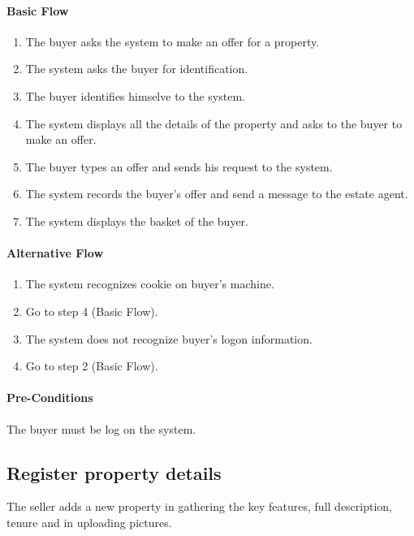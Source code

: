 \documentclass[a4paper,12pt]{article}
\begin{document}
\paragraph{Basic Flow}
\begin{enumerate}
\item The buyer asks the system to make an offer for a property.
\item The system asks the buyer for identification.
\item The buyer identifies himselve to the system.
\item The system displays all the details of the property and asks to the buyer to make an offer.
\item The buyer types an offer and sends his request to the system.
\item The system records the buyer's offer and send a message to the estate agent.
\item The system displays the basket of the buyer.
\end{enumerate}
\paragraph{Alternative Flow}
\begin{enumerate}
\item The system recognizes cookie on buyer's machine. 
\item Go to step 4 (Basic Flow).
\item The system does not recognize buyer's logon information.
\item Go to step 2 (Basic Flow).
\end{enumerate}
\paragraph{Pre-Conditions}
The buyer must be log on the system.

\subsection{Register property details}
The seller adds a new property in gathering the key features, full description, tenure and in uploading pictures.
\end{document}
